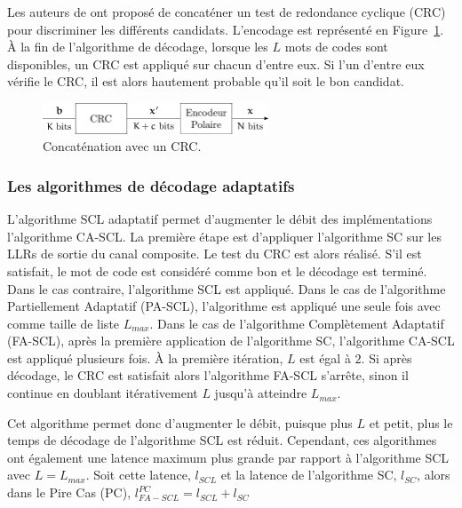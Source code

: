 Les auteurs de \cite{tal_how_2013} ont proposé de concaténer un test de redondance cyclique (CRC) pour discriminer les différents candidats. L'encodage est représenté en Figure~\ref{fig:crc}. \`A la fin de l'algorithme de décodage, lorsque les $L$ mots de codes sont disponibles, un CRC est appliqué sur chacun d'entre eux. Si l'un d'entre eux vérifie le CRC, il est alors hautement probable qu'il soit le bon candidat.

\begin{figure}[t]
\centering
\includegraphics[width=0.6\textwidth]{main/ch1_fig/crc}
\caption{Concaténation avec un CRC.}
\label{fig:crc}
\end{figure}
\subsubsection{Les algorithmes de décodage adaptatifs}

L'algorithme SCL adaptatif permet d'augmenter le débit des implémentations l'algorithme CA-SCL. La première étape est d'appliquer l'algorithme SC sur les LLRs de sortie du canal composite. Le test du CRC est alors réalisé. S'il est satisfait, le mot de code est considéré comme bon et le décodage est terminé. Dans le cas contraire, l'algorithme SCL est appliqué. Dans le cas de l'algorithme Partiellement Adaptatif (PA-SCL), l'algorithme est appliqué une seule fois avec comme taille de liste $L_{max}$. Dans le cas de l'algorithme Complètement Adaptatif (FA-SCL), après la première application de l'algorithme SC, l'algorithme CA-SCL est appliqué plusieurs fois. \`A la première itération, $L$ est égal à $2$. Si après décodage, le CRC est satisfait alors l'algorithme FA-SCL s'arrête, sinon il continue en doublant itérativement $L$ jusqu'à atteindre $L_{max}$.

Cet algorithme permet donc d'augmenter le débit, puisque plus $L$ et petit, plus le temps de décodage de l'algorithme SCL est réduit. Cependant, ces algorithmes ont également une latence maximum plus grande par rapport à l'algorithme SCL avec $L=L_{max}$. Soit cette latence, $l_{SCL}$ et la latence de l'algorithme SC, $l_{SC}$, alors dans le Pire Cas (PC), $l^{PC}_{FA-SCL}=l_{SCL}+l_{SC}$


